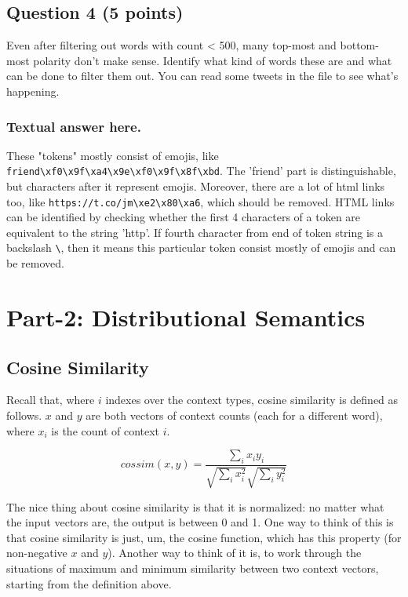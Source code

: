 \documentclass[11pt]{article}
\begin{document}
    \subsection{Question 4 (5 points)}\label{question-4-5-points}

Even after filtering out words with count \textless{} 500, many top-most
and bottom-most polarity don't make sense. Identify what kind of words
these are and what can be done to filter them out. You can read some
tweets in the file to see what's happening.

    \subsubsection{Textual answer here.}\label{textual-answer-here.}

    These "tokens" mostly consist of emojis, like
\texttt{friend\textbackslash{}xf0\textbackslash{}x9f\textbackslash{}xa4\textbackslash{}x9e\textbackslash{}xf0\textbackslash{}x9f\textbackslash{}x8f\textbackslash{}xbd}.
The 'friend' part is distinguishable, but characters after it represent
emojis. Moreover, there are a lot of html links too, like
\texttt{https://t.co/jm\textbackslash{}xe2\textbackslash{}x80\textbackslash{}xa6},
which should be removed. HTML links can be identified by checking
whether the first 4 characters of a token are equivalent to the string
'http'. If fourth character from end of token string is a backslash
\texttt{\textbackslash{}}, then it means this particular token consist
mostly of emojis and can be removed.

    \section{Part-2: Distributional
Semantics}\label{part-2-distributional-semantics}

    \subsection{Cosine Similarity}\label{cosine-similarity}

    Recall that, where \(i\) indexes over the context types, cosine
similarity is defined as follows. \(x\) and \(y\) are both vectors of
context counts (each for a different word), where \(x_i\) is the count
of context \(i\).

\[cossim(x,y) = \frac{ \sum_i x_i y_i }{ \sqrt{\sum_i x_i^2} \sqrt{\sum_i y_i^2} }\]

The nice thing about cosine similarity is that it is normalized: no
matter what the input vectors are, the output is between 0 and 1. One
way to think of this is that cosine similarity is just, um, the cosine
function, which has this property (for non-negative \(x\) and \(y\)).
Another way to think of it is, to work through the situations of maximum
and minimum similarity between two context vectors, starting from the
definition above.
\end{document}

